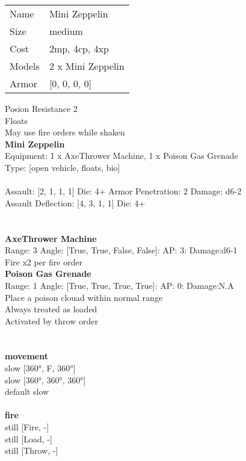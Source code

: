 \begin{tabular}{ll}
  Name & Mini Zeppelin \\
  Size & medium\\
  Cost & 2mp, 4cp, 4xp\\
  Models & 2 x Mini Zeppelin\\
  Armor & [0, 0, 0, 0]\\
\end{tabular}

\noindent Posion Resistance 2\\ 
Floats\\ 
May use fire orders while shaken\\ 


{\bf Mini Zeppelin } \\
Equipment: 1 x AxeThrower Machine, 1 x Poison Gas Grenade \\
Type: [open vehicle, floats, bio] \\
\ \\
Assault: [2, 1, 1, 1] Die: 4+ Armor Penetration: 2 Damage: d6-2 \\
Assault Deflection: [4, 3, 1, 1] Die: 4+\\
\indent  
\ \\

\ \\
{\bf AxeThrower Machine } \\



Range: 3  Angle: [True, True, False, False]: AP: 3: Damage:d6-1 \\
Fire x2 per fire order\\ 




{\bf Poison Gas Grenade } \\



Range: 1  Angle: [True, True, True, True]: AP: 0: Damage:N.A \\
Place a poison clouad within normal range\\ 
Always treated as loaded\\ 
Activated by throw order\\ 




 
\ \\




\ \\ {\bf movement } \\
slow [360°, F, 360°] \\
slow [360°, 360°, 360°] \\
default slow \\
\ \\ {\bf fire } \\
still [Fire, -] \\
still [Load, -] \\
still [Throw, -] \\


